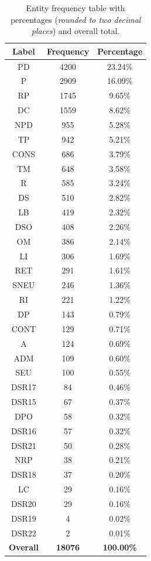 \documentclass[a4paper,
               biblatex,     %
               hyphens,      %
               ]{jacow}
\begin{document}
\begin{table}[h]
\centering
\begin{tabular}{ccc}
\hline
\textbf{Label} & \textbf{Frequency} & \textbf{Percentage} \\
\hline
PD & 4200 & 23.24\% \\
P & 2909 & 16.09\% \\
RP & 1745 & 9.65\% \\
DC & 1559 & 8.62\% \\
NPD & 955 & 5.28\% \\
TP & 942 & 5.21\% \\
CONS & 686 & 3.79\% \\
TM & 648 & 3.58\% \\
R & 585 & 3.24\% \\
DS & 510 & 2.82\% \\
LB & 419 & 2.32\% \\
DSO & 408 & 2.26\% \\
OM & 386 & 2.14\% \\
LI & 306 & 1.69\% \\
RET & 291 & 1.61\% \\
SNEU & 246 & 1.36\% \\
RI & 221 & 1.22\% \\
DP & 143 & 0.79\% \\
CONT & 129 & 0.71\% \\
A & 124 & 0.69\% \\
ADM & 109 & 0.60\% \\
SEU & 100 & 0.55\% \\
DSR17 & 84 & 0.46\% \\
DSR15 & 67 & 0.37\% \\
DPO & 58 & 0.32\% \\
DSR16 & 57 & 0.32\% \\
DSR21 & 50 & 0.28\% \\
NRP & 38 & 0.21\% \\
DSR18 & 37 & 0.20\% \\
LC & 29 & 0.16\% \\
DSR20 & 29 & 0.16\% \\
DSR19 & 4 & 0.02\% \\
DSR22 & 2 & 0.01\% \\
\hline
\textbf{Overall} & \textbf{18076} & \textbf{100.00\%} \\
\hline
\end{tabular}
\caption{Entity frequency table with percentages (\textit{rounded to two decimal places}) and overall total.}
\label{tab:corrected_rounded_entity_freq_percentage_total}
\end{table}
\end{document}
